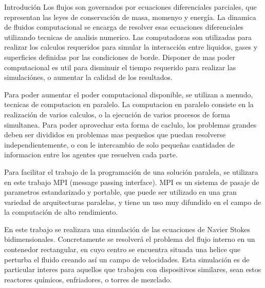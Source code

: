 
\begin{section}{Introdución}
Los flujos son governados por ecuaciones diferenciales parciales, que representan las leyes de conservación de masa, momenyo y energía. La dinamica de fluidos computacional se encarga de resolver esas ecuaciones diferenciales utilizando tecnicas de analisis numerico. Las computadoras son utilizadas para realizar los calculos requeridos para simular la interacción entre liquidos, gases y superficies definidas por las condiciones de borde. Disponer de mas poder computacional es util para disminuir el tiempo requerido para realizar las simulaciónes, o aumentar la calidad de los resultados.

Para poder aumentar el poder computacional disponible, se utilizan a menudo, tecnicas de computacion en paralelo. La computacion en paralelo consiste en la realización de varios calculos, o la ejecución de varios procesos de forma simultanea. Para poder aprovechar esta forma de caclulo, los problemas grandes deben ser divididos en problemas mas pequeños que puedan resolverse independientemente, o con le intercambio de solo pequeñas cantidades de informacion entre los agentes que resuelven cada parte.

Para facilitar el trabajo de la programación de una solución paralela, se utilizara en este trabajo MPI (message passing interface). MPI es un sistema de pasaje de parametros estandarizado y portable, que puede ser utilizado en una gran variedad de arquitecturas paralelas, y tiene un uso muy difundido en el campo de la computación de alto rendimiento. 

En este trabajo se realizara una simulación de las ecuaciones de Navier Stokes bidimensionales. Concretamente se resolverá el problema del flujo interno en un contenedor rectangular, en cuyo centro se encuentra situada una helice que perturba el fluido creando así un campo de velocidades. Esta simulación es de particular interes para aquellos que trabajen con dispositivos similares, sean estos reactores químicos, enfriadores, o torres de mezclado. 

\end{section}


